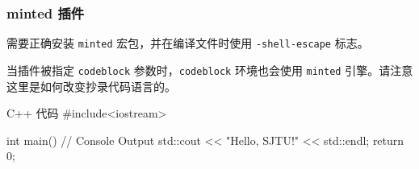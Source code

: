 \documentclass{ctexbeamer}
\begin{document}
\begin{frame}[fragile]  %
  \frametitle{minted 插件}
  需要正确安装 \texttt{minted} 宏包，并在编译文件时使用 \texttt{-shell-escape} 标志。
\end{frame}
\begin{frame}[fragile]
  当插件被指定 \texttt{codeblock} 参数时，\texttt{codeblock} 环境也会使用 \texttt{minted} 引擎。请注意这里是如何改变抄录代码语言的。
\end{frame}
\begin{frame}[fragile]  %
  \renewcommand{\mintedlanguage}{cpp} %
  \begin{codeblock}[]{C++ 代码}
    #include<iostream>

    int main(){
        // Console Output
        std::cout << "Hello, SJTU!" << std::endl;
        return 0;
      }       \end{codeblock}
\end{frame}
\end{document}
